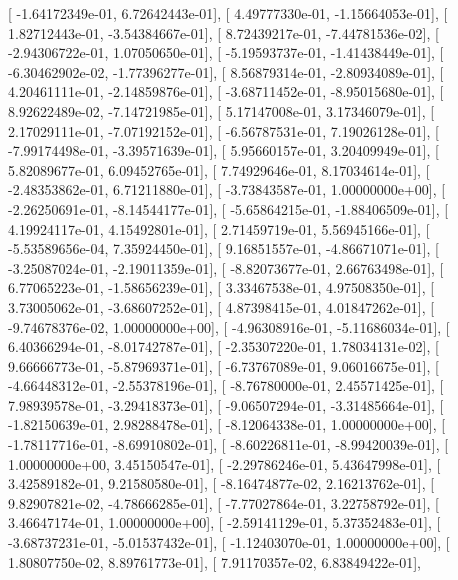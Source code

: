 \documentclass{article}
\begin{document}
       [ -1.64172349e-01,   6.72642443e-01],
       [  4.49777330e-01,  -1.15664053e-01],
       [  1.82712443e-01,  -3.54384667e-01],
       [  8.72439217e-01,  -7.44781536e-02],
       [ -2.94306722e-01,   1.07050650e-01],
       [ -5.19593737e-01,  -1.41438449e-01],
       [ -6.30462902e-02,  -1.77396277e-01],
       [  8.56879314e-01,  -2.80934089e-01],
       [  4.20461111e-01,  -2.14859876e-01],
       [ -3.68711452e-01,  -8.95015680e-01],
       [  8.92622489e-02,  -7.14721985e-01],
       [  5.17147008e-01,   3.17346079e-01],
       [  2.17029111e-01,  -7.07192152e-01],
       [ -6.56787531e-01,   7.19026128e-01],
       [ -7.99174498e-01,  -3.39571639e-01],
       [  5.95660157e-01,   3.20409949e-01],
       [  5.82089677e-01,   6.09452765e-01],
       [  7.74929646e-01,   8.17034614e-01],
       [ -2.48353862e-01,   6.71211880e-01],
       [ -3.73843587e-01,   1.00000000e+00],
       [ -2.26250691e-01,  -8.14544177e-01],
       [ -5.65864215e-01,  -1.88406509e-01],
       [  4.19924117e-01,   4.15492801e-01],
       [  2.71459719e-01,   5.56945166e-01],
       [ -5.53589656e-04,   7.35924450e-01],
       [  9.16851557e-01,  -4.86671071e-01],
       [ -3.25087024e-01,  -2.19011359e-01],
       [ -8.82073677e-01,   2.66763498e-01],
       [  6.77065223e-01,  -1.58656239e-01],
       [  3.33467538e-01,   4.97508350e-01],
       [  3.73005062e-01,  -3.68607252e-01],
       [  4.87398415e-01,   4.01847262e-01],
       [ -9.74678376e-02,   1.00000000e+00],
       [ -4.96308916e-01,  -5.11686034e-01],
       [  6.40366294e-01,  -8.01742787e-01],
       [ -2.35307220e-01,   1.78034131e-02],
       [  9.66666773e-01,  -5.87969371e-01],
       [ -6.73767089e-01,   9.06016675e-01],
       [ -4.66448312e-01,  -2.55378196e-01],
       [ -8.76780000e-01,   2.45571425e-01],
       [  7.98939578e-01,  -3.29418373e-01],
       [ -9.06507294e-01,  -3.31485664e-01],
       [ -1.82150639e-01,   2.98288478e-01],
       [ -8.12064338e-01,   1.00000000e+00],
       [ -1.78117716e-01,  -8.69910802e-01],
       [ -8.60226811e-01,  -8.99420039e-01],
       [  1.00000000e+00,   3.45150547e-01],
       [ -2.29786246e-01,   5.43647998e-01],
       [  3.42589182e-01,   9.21580580e-01],
       [ -8.16474877e-02,   2.16213762e-01],
       [  9.82907821e-02,  -4.78666285e-01],
       [ -7.77027864e-01,   3.22758792e-01],
       [  3.46647174e-01,   1.00000000e+00],
       [ -2.59141129e-01,   5.37352483e-01],
       [ -3.68737231e-01,  -5.01537432e-01],
       [ -1.12403070e-01,   1.00000000e+00],
       [  1.80807750e-02,   8.89761773e-01],
       [  7.91170357e-02,   6.83849422e-01],
\end{document}
